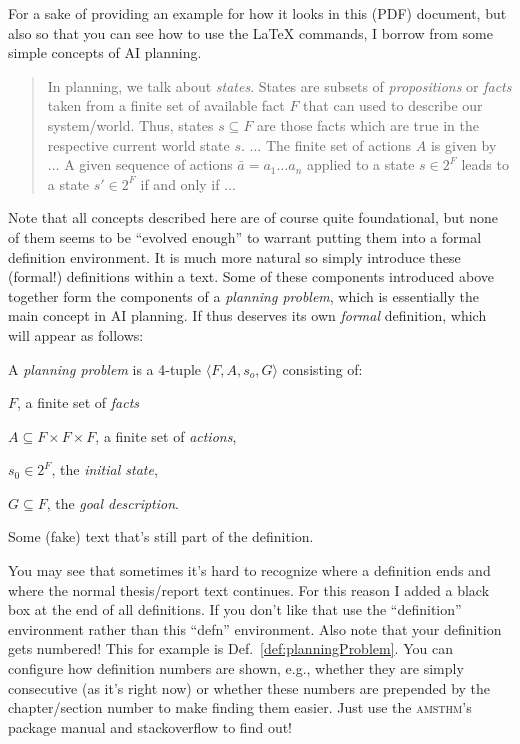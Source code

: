 \begin{itemize}
  For a sake of providing an example for how it looks in this (PDF) document, but also so that you can see how to use the \LaTeX{} commands, I borrow from some simple concepts of AI planning.

  \begin{quote}In planning, we talk about \emph{states}. States are subsets of \emph{propositions} or \emph{facts} taken from a finite set of available fact $F$ that can used to describe our system/world. Thus, states $s\subseteq F$ are those facts which are true in the respective current world state $s$. $\dots$ The finite set of actions $A$ is given by $\dots$ A given sequence of actions $\bar{a}=a_1\dots a_n$ applied to a state $s\in 2^F$ leads to a state $s'\in 2^F$ if and only if $\dots$\end{quote}

  Note that all concepts described here are of course quite foundational, but none of them seems to be ``evolved enough'' to warrant putting them into a formal definition environment. It is much more natural so simply introduce these (formal!) definitions within a text. Some of these components introduced above together form the components of a \emph{planning problem}, which is essentially the main concept in AI planning. If thus deserves its own \emph{formal} definition, which will appear as follows:

  \begin{defn}\label{def:planningProblem}A \emph{planning problem} is a 4-tuple $\langle F, A, s_o, G\rangle$ consisting of:
  \begin{compactitem}
    \item $F$, a finite set of \emph{facts}
    \item $A\subseteq F\times F\times F$, a finite set of \emph{actions},
    \item $s_0\in 2^F$, the \emph{initial state},
    \item $G\subseteq F$, the \emph{goal description}.
  \end{compactitem}
  Some (fake) text that's still part of the definition.
  \end{defn}

  You may see that sometimes it's hard to recognize where a definition ends and where the normal thesis/report text continues. For this reason I added a black box at the end of all definitions. If you don't like that use the ``definition'' environment rather than this ``defn'' environment. Also note that your definition gets numbered! This for example is Def.~\ref{def:planningProblem}. You can configure how definition numbers are shown, e.g., whether they are simply consecutive (as it's right now) or whether these numbers are prepended by the chapter/section number to make finding them easier. Just use the \textsc{amsthm}'s package manual and stackoverflow to find out!


\end{itemize}
